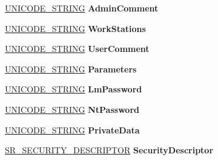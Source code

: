\begin{DoxyCompactItemize}
\hyperlink{struct___u_n_i_c_o_d_e___s_t_r_i_n_g}{U\+N\+I\+C\+O\+D\+E\+\_\+\+S\+T\+R\+I\+NG} {\bfseries Admin\+Comment}
\item 
\mbox{\label{struct___u_s_e_r___a_l_l___i_n_f_o_r_m_a_t_i_o_n_abd181c4774cf21297a1eead9c121e90c}} 
\hyperlink{struct___u_n_i_c_o_d_e___s_t_r_i_n_g}{U\+N\+I\+C\+O\+D\+E\+\_\+\+S\+T\+R\+I\+NG} {\bfseries Work\+Stations}
\item 
\mbox{\label{struct___u_s_e_r___a_l_l___i_n_f_o_r_m_a_t_i_o_n_a533ac05a7a82acb01c46c6d9dad12ef8}} 
\hyperlink{struct___u_n_i_c_o_d_e___s_t_r_i_n_g}{U\+N\+I\+C\+O\+D\+E\+\_\+\+S\+T\+R\+I\+NG} {\bfseries User\+Comment}
\item 
\mbox{\label{struct___u_s_e_r___a_l_l___i_n_f_o_r_m_a_t_i_o_n_a9683c98cdbb79e41f66f373f81fa4496}} 
\hyperlink{struct___u_n_i_c_o_d_e___s_t_r_i_n_g}{U\+N\+I\+C\+O\+D\+E\+\_\+\+S\+T\+R\+I\+NG} {\bfseries Parameters}
\item 
\mbox{\label{struct___u_s_e_r___a_l_l___i_n_f_o_r_m_a_t_i_o_n_acef674fe80e68c8ac7cd08aeb92dcd21}} 
\hyperlink{struct___u_n_i_c_o_d_e___s_t_r_i_n_g}{U\+N\+I\+C\+O\+D\+E\+\_\+\+S\+T\+R\+I\+NG} {\bfseries Lm\+Password}
\item 
\mbox{\label{struct___u_s_e_r___a_l_l___i_n_f_o_r_m_a_t_i_o_n_adc2e30ff0adac8b50d00ddf082f56266}} 
\hyperlink{struct___u_n_i_c_o_d_e___s_t_r_i_n_g}{U\+N\+I\+C\+O\+D\+E\+\_\+\+S\+T\+R\+I\+NG} {\bfseries Nt\+Password}
\item 
\mbox{\label{struct___u_s_e_r___a_l_l___i_n_f_o_r_m_a_t_i_o_n_adf58044e539771ead586f2cf7d81352a}} 
\hyperlink{struct___u_n_i_c_o_d_e___s_t_r_i_n_g}{U\+N\+I\+C\+O\+D\+E\+\_\+\+S\+T\+R\+I\+NG} {\bfseries Private\+Data}
\item 
\mbox{\label{struct___u_s_e_r___a_l_l___i_n_f_o_r_m_a_t_i_o_n_af32569221ca10e4a592d8045f09ff381}} 
\hyperlink{struct___s_r___s_e_c_u_r_i_t_y___d_e_s_c_r_i_p_t_o_r}{S\+R\+\_\+\+S\+E\+C\+U\+R\+I\+T\+Y\+\_\+\+D\+E\+S\+C\+R\+I\+P\+T\+OR} {\bfseries Security\+Descriptor}

\end{DoxyCompactItemize}

